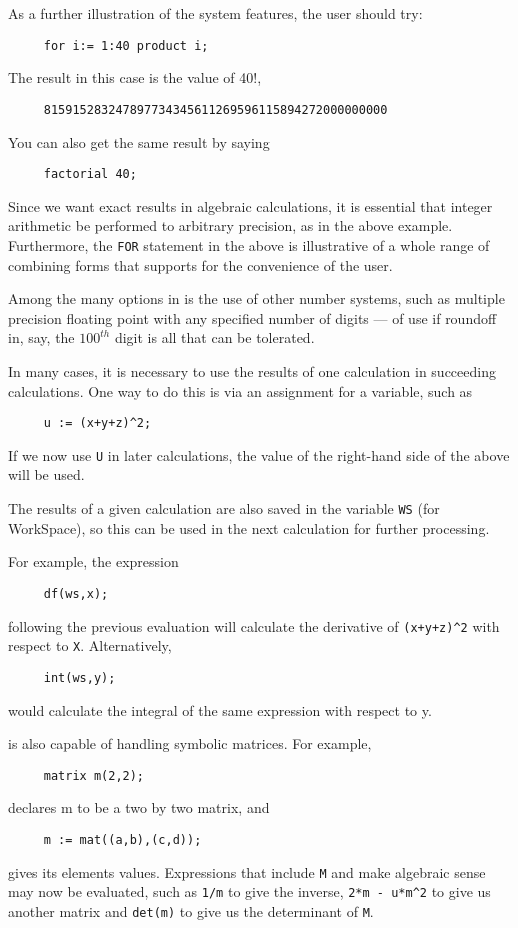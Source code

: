 As a further illustration of the system features, the user should try:
\begin{verbatim}
     for i:= 1:40 product i;
\end{verbatim}
The result in this case is the value of 40!,
\begin{verbatim}
     815915283247897734345611269596115894272000000000
\end{verbatim}
You can also get the same result by saying
\begin{verbatim}
     factorial 40;
\end{verbatim}
Since we want exact results in algebraic calculations, it is essential that
integer arithmetic be performed to arbitrary precision, as in the above
example. Furthermore, the {\tt FOR} statement in the above is illustrative of a
whole range of combining forms that {\REDUCE} supports for the convenience of
the user.

Among the many options in {\REDUCE} is the use of other number systems, such
as multiple precision floating point with any specified number of digits ---
of use if roundoff in, say, the $100^{th}$ digit is all that can be tolerated.

In many cases, it is necessary to use the results of one calculation in
succeeding calculations. One way to do this is via an assignment for a
variable, such as
\begin{verbatim}
     u := (x+y+z)^2;
\end{verbatim}
If we now use {\tt U} in later calculations, the value of the right-hand
side of the above will be used.

The results of a given calculation are also saved in the variable
{\tt WS} (for WorkSpace), so this can be used in the next
calculation for further processing.

For example, the expression
\begin{verbatim}
     df(ws,x);
\end{verbatim}
following the previous evaluation will calculate the derivative of
{\tt (x+y+z)\verb|^|2} with respect to {\tt X}. Alternatively,
\begin{verbatim}
     int(ws,y);
\end{verbatim}
would calculate the integral of the same expression with respect to y.

{\REDUCE} is also capable of handling symbolic matrices. For example,
\begin{verbatim}
     matrix m(2,2);
\end{verbatim}
declares m to be a two by two matrix, and
\begin{verbatim}
     m := mat((a,b),(c,d));
\end{verbatim}
gives its elements values.  Expressions that include {\tt M} and make
algebraic sense may now be evaluated, such as {\tt 1/m} to give the
inverse, {\tt 2*m - u*m\verb|^|2} to give us another matrix and {\tt det(m)}
to give us the determinant of {\tt M}.

